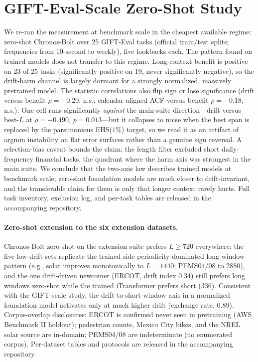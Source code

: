 \section{GIFT-Eval-Scale Zero-Shot Study}
\label{app:gift}

We re-ran the measurement at benchmark scale in the cheapest available regime: zero-shot Chronos-Bolt over 25 GIFT-Eval tasks (official train/test splits; frequencies from 10-second to weekly), five lookbacks each. The pattern found on trained models does not transfer to this regime. Long-context benefit is positive on 23 of 25 tasks (significantly positive on 19, never significantly negative), so the drift-harm channel is largely dormant for a strongly normalized, massively pretrained model. The statistic correlations also flip sign or lose significance (drift versus benefit $\rho=-0.20$, n.s.; calendar-aligned ACF versus benefit $\rho=-0.18$, n.s.). One cell runs significantly \emph{against} the main-suite direction---drift versus best-$L$ at $\rho=+0.490$, $p=0.013$---but it collapses to noise when the best span is replaced by the parsimonious EHS($1\%$) target, so we read it as an artifact of argmin instability on flat error surfaces rather than a genuine sign reversal. A selection-bias caveat bounds the claim: the length filter excluded short daily-frequency financial tasks, the quadrant where the harm axis was strongest in the main suite. We conclude that the two-axis law describes trained models at benchmark scale; zero-shot foundation models are much closer to drift-invariant, and the transferable claim for them is only that longer context rarely hurts. Full task inventory, exclusion log, and per-task tables are released in the accompanying repository.

\paragraph{Zero-shot extension to the six extension datasets.}
Chronos-Bolt zero-shot on the extension suite prefers $L \ge 720$ everywhere: the five low-drift sets replicate the trained-side periodicity-dominated long-window pattern (e.g., solar improves monotonically to $L{=}1440$; PEMS04/08 to 2880), and the one drift-driven newcomer (ERCOT, drift index 0.34) still prefers long windows zero-shot while the trained iTransformer prefers short (336). Consistent with the GIFT-scale study, the drift-to-short-window axis in a normalized foundation model activates only at much higher drift (exchange rate, 0.89). Corpus-overlap disclosures: ERCOT is confirmed never seen in pretraining (AWS Benchmark II holdout); pedestrian counts, Mexico City bikes, and the NREL solar source are in-domain; PEMS04/08 are indeterminate (no enumerated corpus). Per-dataset tables and protocols are released in the accompanying repository.
